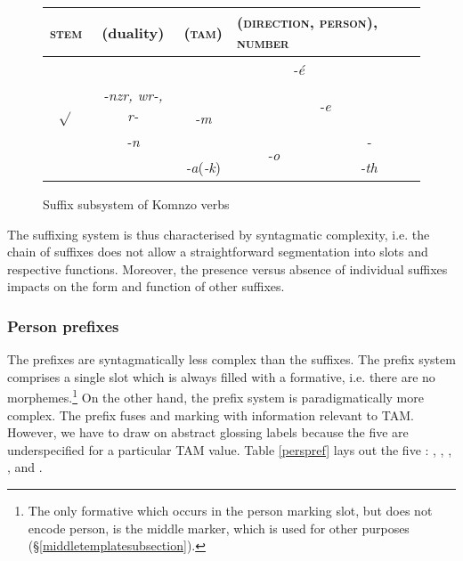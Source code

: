\begin{figure}
\begin{center}%
	\begin{tabularx}{\textwidth}{|c|c|c|c|c|}
		\hline
		\textsc{stem}&{(duality)}&\multicolumn{1}{l|}{\textsc{(tam)}}&\multicolumn{2}{l|}{\textsc{(direction, person), number}}\\ 
		\hline
		\multirow{4}{*}{$\sqrt{}$}&&\multicolumn{3}{c|}{\emph{-é}}\\ \cline{3-5}
		&\emph{-nzr, wr-, r-} & \multirow{2}{*}{\emph{-m}}&  \multicolumn{2}{c|}{\emph{-e}}\\\cline{4-5}
		&\emph{-n} &&\multirow{2}{*}{\emph{-o}} & \emph{-\Zero}\\\cline{3-3}\cline{5-5}
		&&\multicolumn{1}{c|}{\emph{-a}(\emph{-k})} & & \emph{-th}\\
		\hline
	\end{tabularx}
\end{center}
\caption{Suffix subsystem of Komnzo verbs}\label{suffsubsys}
\end{figure}%

The suffixing system is thus characterised by syntagmatic complexity, i.e. the chain of suffixes does not allow a straightforward segmentation into slots and respective functions. Moreover, the presence versus absence of individual suffixes impacts on the form and function of other suffixes.

\subsubsection{Person prefixes} \label{personprefsection}

The  prefixes are syntagmatically less complex than the  suffixes. The prefix system comprises a single slot which is always filled with a formative, i.e. there are no  morphemes.\footnote{The only formative which occurs in the person marking slot, but does not encode person, is the middle marker, which is used for other purposes (\S{}\ref{middletemplatesubsection}).} On the other hand, the prefix system is paradigmatically more complex. The prefix fuses  and  marking with information relevant to TAM. However, we have to draw on abstract glossing labels because the five  are underspecified for a particular TAM value. Table \ref{perspref} lays out the five : \Alph, \Bet, \Betaone, \Betatwo, and \Gam.

